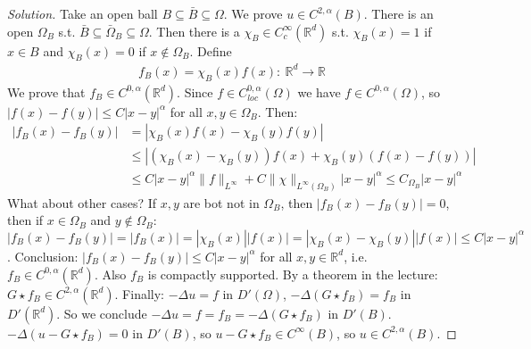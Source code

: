 \documentclass{report}
\theoremstyle{tommy}
\begin{document}
  \begin{proof}[Solution]
    Take an open ball \(B \subseteq \bar B \subseteq \Omega\). We prove \(u \in C^{2, \alpha}(B)\). There is an open \(\Omega_B\) s.t. \(\bar B \subseteq \bar \Omega_B \subseteq \Omega\). Then there is a \(\chi_B \in C_c^\infty(\mathbb{R}^d)\) s.t. \(\chi_B(x) = 1\) if \(x \in B\) and \(\chi_B(x) = 0\) if \(x \notin \Omega_B\). Define
    \begin{align*}
      f_B(x) = \chi_B(x)f(x): \ \mathbb{R}^d \to \mathbb{R}
    \end{align*}
    We prove that \(f_B \in C^{0, \alpha}(\mathbb{R}^d)\). Since \(f \in C_{loc}^{0,\alpha}(\Omega)\) we have \(f \in C^{0,\alpha}(\Omega)\), so \(|f(x)-f(y)| \le C|x-y|^\alpha\) for all \(x,y \in \Omega_B\). Then:
    \begin{align*}
      |f_B(x) - f_B(y)| 
      &= |\chi_B(x) f(x) - \chi_B(y) f(y)| \\
      &\le |(\chi_B(x) - \chi_B(y))f(x) + \chi_B(y)(f(x)-f(y))| \\
      &\le C |x-y|^\alpha \|f\|_{L^\infty} + C\|\chi\|_{L^\infty(\Omega_B)}|x-y|^\alpha
      \le C_{\Omega_B}|x-y|^\alpha
    \end{align*}
    What about other cases? If \(x, y\) are bot not in \(\Omega_B\), then \(|f_B(x) - f_B(y)| =0\), then if \(x \in \Omega_B\) and \(y \notin \Omega_B\): \(|f_B(x) - f_B(y)| = |f_B(x)| = |\chi_B(x)||f(x)| = |\chi_B(x) - \chi_B(y)||f(x)| \le C |x-y|^\alpha\). Conclusion: \(|f_B(x) - f_B(y)| \le C|x-y|^\alpha\) for all \(x,y \in \mathbb{R}^d\), i.e. \(f_B \in C^{0,\alpha}(\mathbb{R}^d)\). Also \(f_B\) is compactly supported. By a theorem in the lecture: \(G \star f_B \in C^{2, \alpha}(\mathbb{R}^d)\). Finally: \(-\Delta u = f\) in \(D'(\Omega)\), \(-\Delta (G \star f_B) = f_B\) in \(D'(\mathbb{R}^d)\). So we conclude \(-\Delta u = f = f_B = - \Delta (G\star f_B) \) in \(D'(B)\). \(-\Delta(u - G \star f_B)= 0\) in \(D'(B)\), so \(u - G \star f_B \in C^\infty(B)\), so \(u \in C^{2,\alpha}(B)\).
  \end{proof}
\end{document}
